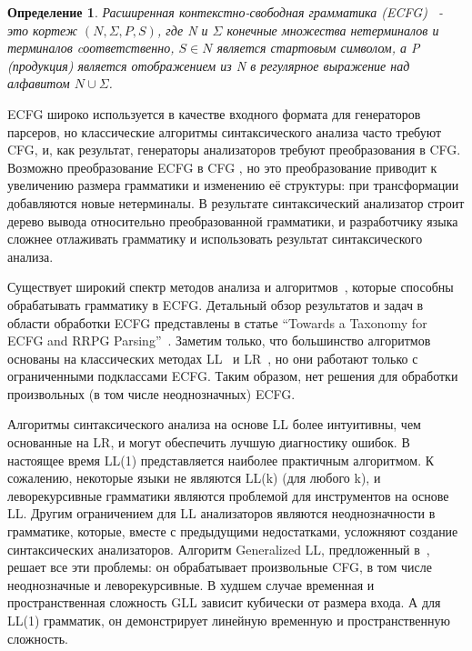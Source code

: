 \documentclass[12pt]{matmex-diploma-custom}
\newtheorem{mydef}{Определение}
\begin{document}
	\begin{mydef}
		Расширенная контекстно-свободная грамматика (ECFG)~\cite{ECFG} - это кортеж $(N, \Sigma, P, S)$,
		где N и $\Sigma$ конечные множества нетерминалов и терминалов cоответственно, 
		$S\in N$ является стартовым символом, а P (продукция) является отображением из N в
		регулярное выражение над алфавитом $N \cup \Sigma$.
		
	\end{mydef}
	ECFG широко используется в качестве входного формата для генераторов парсеров, 
	но классические алгоритмы синтаксического анализа часто требуют CFG, и, 
	как результат, генераторы анализаторов требуют преобразования в CFG. 
	Возможно преобразование ECFG в CFG \cite{ELL}, но это преобразование приводит к увеличению
	размера грамматики и изменению её структуры: при трансформации добавляются новые
	нетерминалы. В результате синтаксический анализатор строит дерево вывода относительно
	преобразованной грамматики, и разработчику языка сложнее отлаживать грамматику 
	и использовать результат синтаксического анализа.
	
	Существует широкий спектр методов анализа и алгоритмов~\cite{AttributedELL,ELRR,
		ECFGparsing,ELLParser,ELL,ECFG,ELALR,ELRParsing}, которые способны обрабатывать 
	грамматику в ECFG. Детальный обзор результатов и задач в области обработки ECFG 
	представлены в статье ``Towards a Taxonomy for ECFG and RRPG Parsing''~\cite{ECFG}.
	Заметим только, что большинство алгоритмов основаны на классических методах
	LL~\cite{ELLParser,AttributedELL,PredictiveECFG} и LR~\cite{ELRParsing,ELALR,ELRR},
	но они работают только с ограниченными подклассами ECFG. Таким образом, нет решения 
	для обработки произвольных (в том числе неоднозначных) ECFG.
	
	Алгоритмы синтаксического анализа на основе LL более интуитивны, чем основанные на LR, и могут
	обеспечить лучшую диагностику ошибок. В настоящее время LL(1) представляется
	наиболее практичным алгоритмом. К сожалению, некоторые языки не являются LL(k) (для любого k),
	и леворекурсивные грамматики являются проблемой для инструментов на основе LL. 
	Другим ограничением для LL анализаторов являются неоднозначности в грамматике, 
	которые, вместе с предыдущими недостатками, усложняют создание синтаксических 
	анализаторов. Алгоритм Generalized LL, предложенный в~\cite{scott2010gll}, решает 
	все эти проблемы: он обрабатывает произвольные CFG, в том числе неоднозначные и
	леворекурсивные.
	В худшем случае временная и пространственная сложность GLL зависит кубически от 
	размера входа. А для LL(1) грамматик, он демонстрирует линейную временную и
	пространственную сложность.
	
\end{document}
